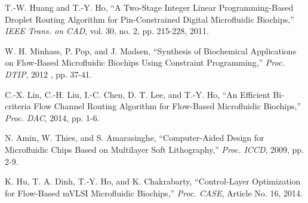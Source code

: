 \documentclass[journal]{IEEEtran}
\begin{document}
\begin{thebibliography}{99}
{%

T.-W. Huang and T.-Y. Ho, 
``A Two-Stage Integer Linear Programming-Based Droplet Routing Algorithm for Pin-Constrained Digital Microfluidic Biochips,''
{\em IEEE Trans. on CAD}, 
vol. 30, no. 2, pp. 215-228, 2011.




W. H. Minhass, P. Pop, and J. Madsen, 
``Synthesis of Biochemical Applications on Flow-Based Microfluidic Biochips Using Constraint Programming,''
{\em Proc. DTIP},
2012 , pp. 37-41.


C.-X. Lin, C.-H. Liu, I.-C. Chen, D. T. Lee, and T.-Y. Ho,
``An Efficient Bi-criteria Flow Channel Routing Algorithm for Flow-Based Microfluidic Biochips,''
{\em Proc. DAC},
2014, pp. 1-6.

N. Amin, W. Thies, and S. Amarasinghe, 
``Computer-Aided Design for Microfluidic Chips Based on Multilayer Soft Lithography,''
{\em Proc. ICCD}, 
2009, pp. 2-9.

K. Hu, T. A. Dinh, T.-Y. Ho, and K. Chakrabarty, 
``Control-Layer Optimization for Flow-Based mVLSI Microfluidic Biochips,''
{\em Proc. CASE}, Article No. 16, 2014.

}
\end{thebibliography}
\end{document}
